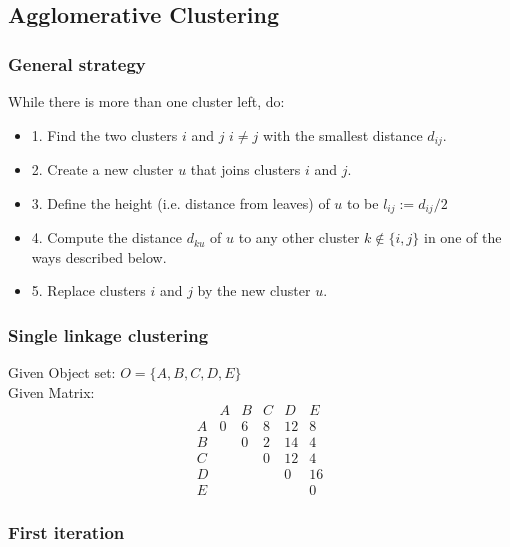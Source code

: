 
\newcommand{\thegivenstuff}[0]{
Given Object set: $O = \{A, B, C, D, E\}$ \\ \newline
Given Matrix: 
\[
\begin{array}{c|ccccc}
  & A & B & C & D & E \\
\hline
A & 0 & 6 & 8 & 12 & 8 \\
B &   & 0 & 2 & 14 & 4 \\ 
C &   &   & 0 & 12 & 4 \\ 
D &   &   &   & 0 & 16 \\
E &   &   &   &   & 0
\end{array}
\]
}



\newcommand{\stepone}[0]{1. Find the two clusters $i$ and $j$ $i \neq j$ with the smallest distance $d_{ij}$.}
\newcommand{\steptwo}[0]{2. Create a new cluster $u$ that joins clusters $i$ and $j$.}
\newcommand{\stepthree}[0]{3. Define the height (i.e. distance from leaves) of $u$ to be $l_{ij} := d_{ij} /2$}
\newcommand{\stepfour}[0]{4. Compute the distance $d_{ku}$ of $u$ to any other cluster $k \notin \{i, j\}$ in one of the ways described below.}
\newcommand{\stepfive}[0]{5. Replace clusters $i$ and $j$ by the new cluster $u$.}

\subsection*{Agglomerative Clustering}

\subsubsection*{General strategy}

While there is more than one cluster left, do:
\begin{itemize}
    \item[] \stepone
    \item[] \steptwo
    \item[] \stepthree
    \item[] \stepfour
    \item[] \stepfive
\end{itemize}

\subsubsection{Single linkage clustering}
\thegivenstuff
\subsubsection*{First iteration}
